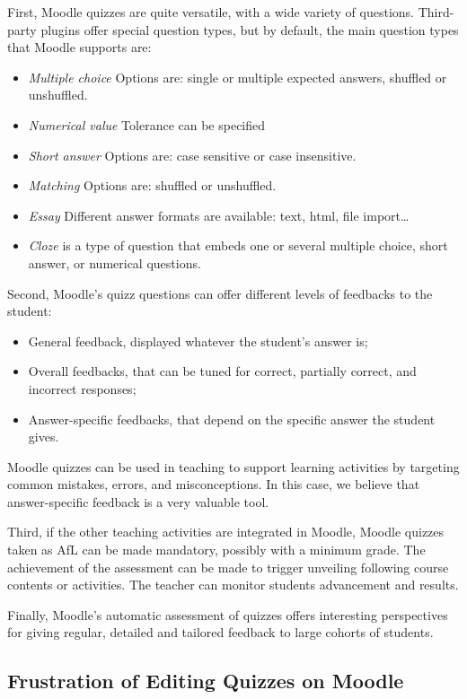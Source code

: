 \documentclass[twocolumn,a4paper,9pt]{article}
\begin{document}
First, Moodle quizzes are quite versatile, with a wide variety of questions. 
Third-party plugins offer special question types, but by default, the main 
question types that Moodle supports are:
\begin{itemize}
\item \emph{Multiple choice} Options are: single or multiple expected 
answers, shuffled or unshuffled.
\item \emph{Numerical value} Tolerance can be specified
\item \emph{Short answer} Options are: case sensitive or case insensitive.
\item \emph{Matching} Options are: shuffled or unshuffled.
\item \emph{Essay} Different answer formats are available: text, html, file 
import\dots
\item \emph{Cloze} is a type of question that embeds one or several multiple 
choice, short answer, or numerical questions.
\end{itemize}

Second, Moodle's quizz questions can offer different levels of feedbacks 
to the student:
\begin{itemize}
	\item General feedback, displayed whatever the student's answer is;
	\item Overall feedbacks, that can be tuned for correct, partially correct, 
	and incorrect responses;
	\item Answer-specific feedbacks, that depend on the specific answer the 
	student gives.
\end{itemize}
Moodle quizzes can be used in teaching to support learning activities by 
targeting common mistakes, errors, and misconceptions. In this case, we believe 
that answer-specific feedback is a very valuable tool.

Third, if the other teaching activities are integrated in Moodle, Moodle 
quizzes taken as AfL can be made mandatory, possibly with a minimum grade. The 
achievement of the assessment can be made to trigger unveiling following course 
contents or activities. The teacher can monitor students advancement and 
results.

Finally, Moodle's automatic assessment of quizzes offers interesting 
perspectives for giving regular, detailed and tailored feedback to large 
cohorts of students.

\subsection{Frustration of Editing Quizzes on Moodle}
\end{document}
